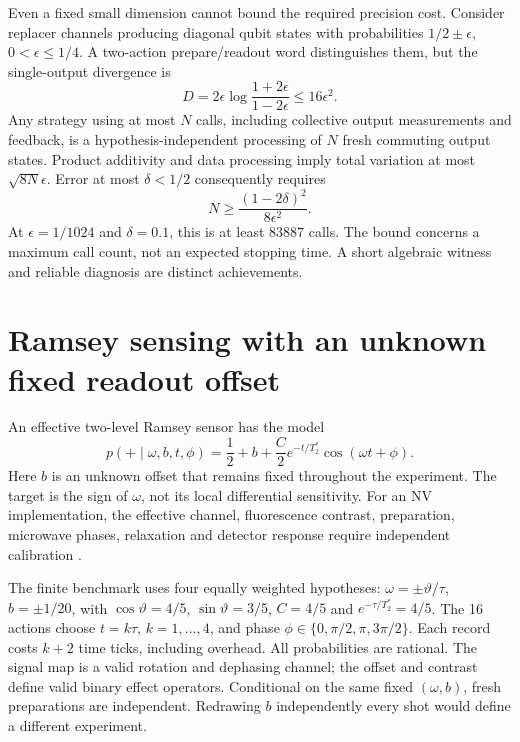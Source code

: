 Even a fixed small dimension cannot bound the required precision cost.
Consider replacer channels producing diagonal qubit states with probabilities
$1/2\pm\epsilon$, $0<\epsilon\leq1/4$. A two-action prepare/readout word
distinguishes them, but the single-output divergence is
\begin{equation}
 D=2\epsilon\log\frac{1+2\epsilon}{1-2\epsilon}\leq16\epsilon^2.
\end{equation}
Any strategy using at most $N$ calls, including collective output measurements
and feedback, is a hypothesis-independent processing of $N$ fresh commuting
output states. Product additivity and data processing imply total variation
at most $\sqrt{8N}\epsilon$. Error at most $\delta<1/2$ consequently requires
\begin{equation}
 N\geq\frac{(1-2\delta)^2}{8\epsilon^2}.
\end{equation}
At $\epsilon=1/1024$ and $\delta=0.1$, this is at least $83887$ calls.
The bound concerns a maximum call count, not an expected stopping time.
A short algebraic witness and reliable diagnosis are distinct achievements.

\section{Ramsey sensing with an unknown fixed readout offset}
\label{sec:applications-ramsey}

An effective two-level Ramsey sensor has the model
\begin{equation}
 p(+\mid\omega,b,t,\phi)
 =\frac12+b+\frac C2 e^{-t/T_2^*}\cos(\omega t+\phi).
 \label{eq:applications-ramsey}
\end{equation}
Here $b$ is an unknown offset that remains fixed throughout the experiment.
The target is the sign of $\omega$, not its local differential sensitivity.
For an NV implementation, the effective channel, fluorescence contrast,
preparation, microwave phases, relaxation and detector response require
independent calibration \cite{physics-degen}.

The finite benchmark uses four equally weighted hypotheses:
$\omega=\pm\vartheta/\tau$, $b=\pm1/20$, with
$\cos\vartheta=4/5$, $\sin\vartheta=3/5$, $C=4/5$ and
$e^{-\tau/T_2^*}=4/5$. The 16 actions choose $t=k\tau$, $k=1,\ldots,4$,
and phase $\phi\in\{0,\pi/2,\pi,3\pi/2\}$. Each record costs $k+2$ time
ticks, including overhead. All probabilities are rational. The signal map
is a valid rotation and dephasing channel; the offset and contrast define
valid binary effect operators. Conditional on the same fixed $(\omega,b)$,
fresh preparations are independent. Redrawing $b$ independently every shot
would define a different experiment.

